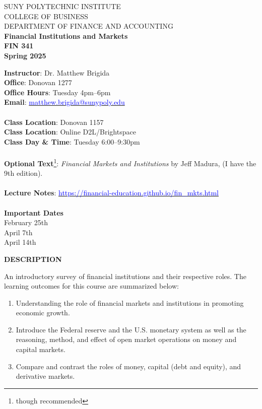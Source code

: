 \documentclass{article}
\begin{document}
\begin{center}
SUNY POLYTECHNIC INSTITUTE \\
COLLEGE OF BUSINESS\\
DEPARTMENT OF FINANCE AND ACCOUNTING\\
\vspace*{.25cm}
{\bf Financial Institutions and Markets}\\
{\bf FIN 341}\\
{\bf Spring 2025}\\
\end{center}
\vspace*{5pt}
{\bf Instructor}: Dr. Matthew Brigida\\
{\bf Office}: Donovan 1277\\
{\bf Office Hours}: Tuesday 4pm--6pm \\
{\bf Email}: \href{mailto:matthew.brigida@sunypoly.edu}{\textcolor{blue}{matthew.brigida@sunypoly.edu}}\\
\\
{\bf Class Location}:  Donovan 1157\\
{\bf Class Location}:  Online D2L/Brightspace\\
{\bf Class Day \& Time}: Tuesday 6:00--9:30pm \\
\\
  {\bf Optional Text}\footnote{though recommended}: {\it Financial Markets and Institutions} by Jeff Madura, (I have the 9th edition).\\
  \\
  {\bf Lecture Notes}: \href{https://financial-education.github.io/fin_mkts.html}{\textcolor{blue}{\url{https://financial-education.github.io/fin_mkts.html}}}
\\
\\
{\bf Important Dates}
\\
\hspace*{0.3cm}{\bf Exam 1 Due:}  February 25th \\
\hspace*{0.3cm}{\bf Exam 2 Due:}  April 7th \\
\hspace*{0.3cm}{\bf Participation Posts Due:} April 14th
\begin{center}
{\bf DESCRIPTION}
\end{center}  
An introductory survey of financial institutions and their respective roles. The
learning outcomes for this course are summarized below:
\begin{enumerate}
\item  Understanding the role of financial markets and institutions in promoting economic
growth. 
\item Introduce the Federal reserve and the U.S. monetary system as well as the reasoning,
method, and effect of open market operations on money and capital markets.
\item Compare and contrast the roles of money, capital (debt and equity), and derivative markets.
\end{enumerate}
\end{document}
